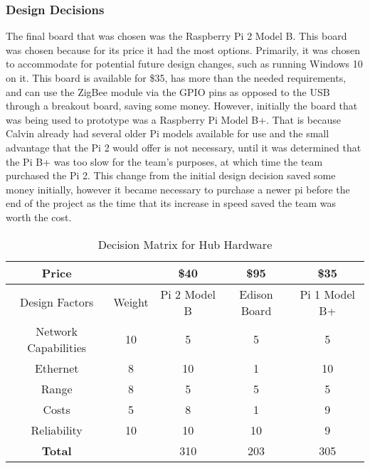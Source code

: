 \documentclass[PPFS.tex]{template/subfiles}
\begin{document}
\subsubsection{Design Decisions}
The final board that was chosen was the Raspberry Pi 2 Model B. This board was chosen because for its price it had the most options. Primarily, it was chosen to accommodate for potential future design changes, such as running Windows 10 on it. This board is available for \$35, has more than the needed requirements, and can use the ZigBee module via the GPIO pins as opposed to the USB through a breakout board, saving some money. However, initially the board that was being used to prototype was a Raspberry Pi Model B+. That is because Calvin already had several older Pi models available for use and the small advantage that the Pi 2 would offer is not necessary, until it was determined that the Pi B+ was too slow for the team's purposes, at which time the team purchased the Pi 2. This change from the initial design decision saved some money initially, however it became necessary to purchase a newer pi before the end of the project as the time that its increase in speed saved the team was worth the cost. 

       \begin{table}[h!]
       	\begin{center}
       		\caption{Decision Matrix for Hub Hardware}
       		\label{tab:hubMatrix}
       		\begin{tabular}{|c|c|c|c|c|}
       			\hline
       			Price && \$40 & \$95 & \$35 \\
       			\hline
       			Design Factors & Weight & Pi 2 Model B & Edison Board & Pi 1 Model B+ \\
       			\hline
       			Network Capabilities & 10 & 5 & 5 & 5\\
       			\hline
       			Ethernet & 8 & 10 & 1 & 10 \\
       			\hline
       			Range & 8 & 5 & 5 & 5 \\
       			\hline
       			Costs & 5 & 8 & 1 & 9 \\
       			\hline
       			Reliability & 10 & 10 & 10 & 9 \\
       			\hline
       			\textbf{Total} && 310 & 203 & 305 \\
       			\hline
       		\end{tabular}
       	\end{center}
       \end{table}
\end{document}
